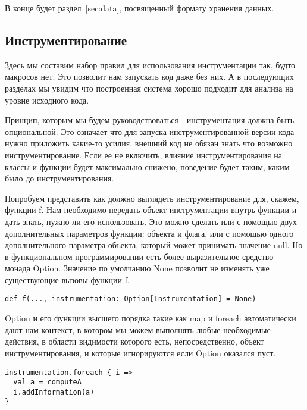 В конце будет раздел~\ref{sec:data}, посвященный формату хранения данных.

\subsection{Инструментирование}
\label{sec:instrumentation}

Здесь мы составим набор правил для использования инструментации так,
будто макросов нет.
Это позволит нам запускать код даже без них.
А в последующих разделах мы увидим что построенная система хорошо подходит
для анализа на уровне исходного кода.

Принцип, которым мы будем руководствоваться - инструментация должна быть опциональной.
Это означает что для запуска инструментированной версии кода нужно приложить
какие-то усилия, внешний код не обязан знать что возможно инструментирование.
Если ее не включить, влияние инструментирования на классы и функции будет
максимально снижено, поведение будет таким, каким было до инструментирования.

Попробуем представить как должно выглядеть инструментирование для, скажем, функции f.
Нам необходимо передать объект инструментации внутрь функции и дать знать,
нужно ли его использовать.
Это можно сделать или с помощью двух дополнительных параметров функции:
объекта и флага, или с помощью одного дополнительного параметра объекта,
который может принимать значение null.
Но в функциональном программировании есть более выразительное средство -
монада Option.
Значение по умолчанию None позволит не изменять уже существующие вызовы функции f.

\begin{lstlisting}[caption={Явная передача объекта инструментации внутрь функции}]
def f(..., instrumentation: Option[Instrumentation] = None)
\end{lstlisting}

Option и его функции высшего порядка такие как map и foreach автоматически дают нам
контекст, в котором мы можем выполнять любые необходимые действия,
в области видимости которого есть, непосредственно, объект инструментирования,
и которые игнорируются если Option оказался пуст.

\begin{samepage}
\begin{lstlisting}[caption={Действия внутри контекста инструментации}]
instrumentation.foreach { i =>
  val a = computeA
  i.addInformation(a)
}
\end{lstlisting}
\end{samepage}

